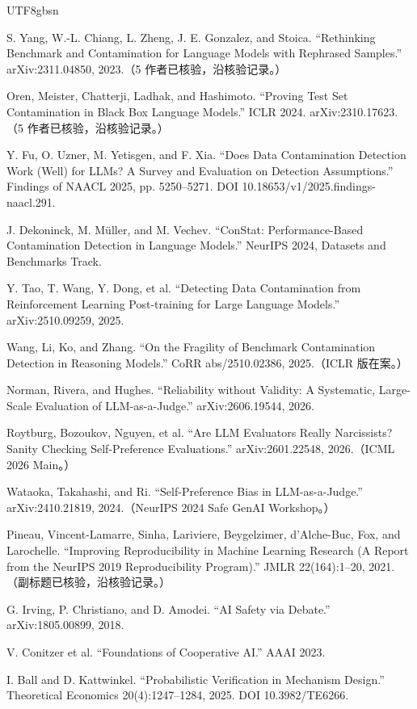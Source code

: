 \documentclass[10pt,a4paper]{article}
\begin{document}
\begin{CJK}{UTF8}{gbsn}
\begin{list}{}
\item [{[15]}] S. Yang, W.-L. Chiang, L. Zheng, J. E. Gonzalez, and Stoica. ``Rethinking Benchmark and Contamination for Language Models with Rephrased Samples.'' arXiv:2311.04850, 2023.（5 作者已核验，沿核验记录。）
\item [{[16]}] Oren, Meister, Chatterji, Ladhak, and Hashimoto. ``Proving Test Set Contamination in Black Box Language Models.'' ICLR 2024. arXiv:2310.17623.（5 作者已核验，沿核验记录。）
\item [{[17]}] Y. Fu, O. Uzner, M. Yetisgen, and F. Xia. ``Does Data Contamination Detection Work (Well) for LLMs? A Survey and Evaluation on Detection Assumptions.'' Findings of NAACL 2025, pp. 5250–5271. DOI 10.18653/v1/2025.findings-naacl.291.
\item [{[18]}] J. Dekoninck, M. Müller, and M. Vechev. ``ConStat: Performance-Based Contamination Detection in Language Models.'' NeurIPS 2024, Datasets and Benchmarks Track.
\item [{[19]}] Y. Tao, T. Wang, Y. Dong, et al. ``Detecting Data Contamination from Reinforcement Learning Post-training for Large Language Models.'' arXiv:2510.09259, 2025.
\item [{[20]}] Wang, Li, Ko, and Zhang. ``On the Fragility of Benchmark Contamination Detection in Reasoning Models.'' CoRR abs/2510.02386, 2025.（ICLR 版在案。）
\item [{[21]}] Norman, Rivera, and Hughes. ``Reliability without Validity: A Systematic, Large-Scale Evaluation of LLM-as-a-Judge.'' arXiv:2606.19544, 2026.
\item [{[22]}] Roytburg, Bozoukov, Nguyen, et al. ``Are LLM Evaluators Really Narcissists? Sanity Checking Self-Preference Evaluations.'' arXiv:2601.22548, 2026.（ICML 2026 Main。）
\item [{[23]}] Wataoka, Takahashi, and Ri. ``Self-Preference Bias in LLM-as-a-Judge.'' arXiv:2410.21819, 2024.（NeurIPS 2024 Safe GenAI Workshop。）
\item [{[24]}] Pineau, Vincent-Lamarre, Sinha, Lariviere, Beygelzimer, d'Alche-Buc, Fox, and Larochelle. ``Improving Reproducibility in Machine Learning Research (A Report from the NeurIPS 2019 Reproducibility Program).'' JMLR 22(164):1–20, 2021.（副标题已核验，沿核验记录。）
\item [{[25]}] G. Irving, P. Christiano, and D. Amodei. ``AI Safety via Debate.'' arXiv:1805.00899, 2018.
\item [{[26]}] V. Conitzer et al. ``Foundations of Cooperative AI.'' AAAI 2023.
\item [{[27]}] I. Ball and D. Kattwinkel. ``Probabilistic Verification in Mechanism Design.'' Theoretical Economics 20(4):1247–1284, 2025. DOI 10.3982/TE6266.

\end{list}
\end{CJK}
\end{document}
